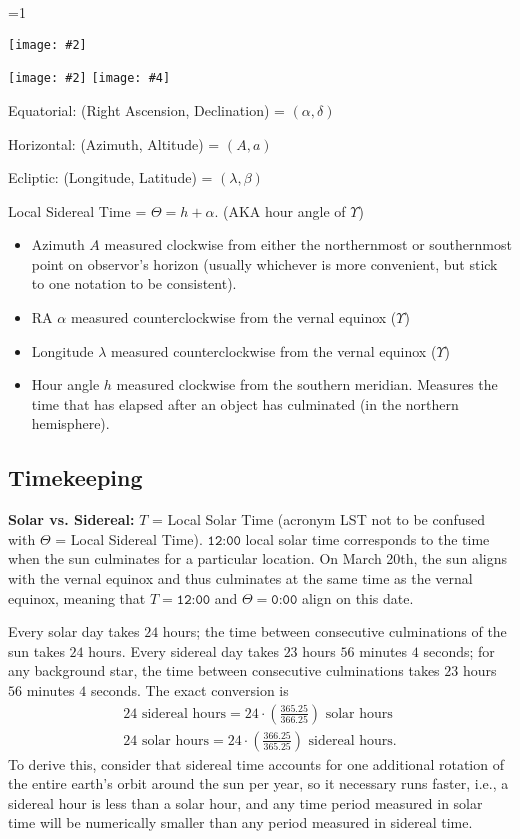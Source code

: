 \documentclass[11pt]{article}
\newcommand{\V}{

\vspace{\baselineskip}

}
\newcommand{\image}[5][1]{
\ifnum #1=1 
    \begin{center}
        \texttt{[image: \#2]}
    \end{center}
\else
    \begin{center}
        \texttt{[image: \#2]}
        \texttt{[image: \#4]}
    \end{center}
\fi
}
\begin{document}
\image[2]{images/rah.png}{7.5}{images/conversion.png}{7.5}

Equatorial: (Right Ascension, Declination) = $(\alpha, \delta)$

Horizontal: (Azimuth, Altitude) = $(A, a)$

Ecliptic: (Longitude, Latitude) = $(\lambda, \beta)$

Local Sidereal Time = $\Theta = h + \alpha$. (AKA hour angle of $\Upsilon$)

\begin{itemize}
\item Azimuth $A$ measured clockwise from either the northernmost or southernmost point on observor's horizon (usually whichever is more convenient, but stick to one notation to be consistent). 

\item RA $\alpha$ measured counterclockwise from the vernal equinox ($\Upsilon$)

\item Longitude $\lambda$ measured counterclockwise from the vernal equinox ($\Upsilon$)

\item Hour angle $h$ measured clockwise from the southern meridian. Measures the time that has elapsed after an object has culminated (in the northern hemisphere).
\end{itemize}

\subsection{Timekeeping}

\textbf{Solar vs. Sidereal:} $T$ = Local Solar Time (acronym LST not to be confused with $\Theta$ = Local Sidereal Time). $\texttt{12:00}$ local solar time corresponds to the time when the sun culminates for a particular location. On March 20th, the sun aligns with the vernal equinox and thus culminates at the same time as the vernal equinox, meaning that $T = \texttt{12:00}$ and $\Theta = \texttt{0:00}$ align on this date.

Every solar day takes $24$ hours; the time between consecutive culminations of the sun takes $24$ hours. Every sidereal day takes $23$ hours $56$ minutes $4$ seconds; for any background star, the time between consecutive culminations takes $23$ hours $56$ minutes $4$ seconds. The exact conversion is 
\begin{gather*}
    24\text{ sidereal hours} = 24\cdot \left(\frac{365.25}{366.25}\right)\text{ solar hours} \\
    24\text{ solar hours} = 24\cdot \left(\frac{366.25}{365.25}\right)\text{ sidereal hours}. 
\end{gather*}
To derive this, consider that sidereal time accounts for one additional rotation of the entire earth's orbit around the sun per year, so it necessary runs faster, i.e., a sidereal hour is less than a solar hour, and any time period measured in solar time will be numerically smaller than any period measured in sidereal time.\V
\end{document}
